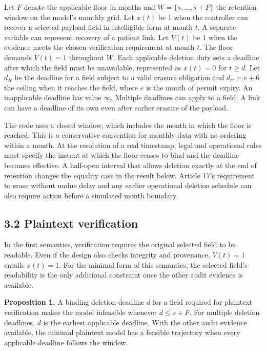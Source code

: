 \documentclass[preprint,review,12pt]{elsarticle}
\begin{document}
Let \(F\) denote the applicable floor in months and
\(W = \{ s,\ldots,s + F\}\) the retention window on the model's monthly
grid. Let \(x(t)\) be 1 when the controller can recover a selected
payload field in intelligible form at month \(t\). A separate variable
can represent recovery of a patient link. Let \(V(t)\) be 1 when the
evidence meets the chosen verification requirement at month \(t\). The
floor demands \(V(t) = 1\) throughout \(W\). Each applicable deletion
duty sets a deadline after which the field must be unavailable,
represented as \(x(t) = 0\) for \(t \geq d\). Let \(d_{R}\) be the
deadline for a field subject to a valid erasure obligation and
\(d_{C} = e + 6\) the ceiling when it reaches the field, where \(e\) is
the month of permit expiry. An inapplicable deadline has value
\(\infty\). Multiple deadlines can apply to a field. A link can have a
deadline of its own even after earlier erasure of the payload.

The code uses a closed window, which includes the month in which the
floor is reached. This is a conservative convention for monthly data
with no ordering within a month. At the resolution of a real timestamp,
legal and operational rules must specify the instant at which the floor
ceases to bind and the deadline becomes effective. A half-open interval
that allows deletion exactly at the end of retention changes the
equality case in the result below. Article 17's requirement to erase
without undue delay and any earlier operational deletion schedule can
also require action before a simulated month boundary.

\hypertarget{plaintext-verification}{%
\subsection{3.2 Plaintext verification}\label{plaintext-verification}}

In the first semantics, verification requires the original selected
field to be readable. Even if the design also checks integrity and
provenance, \(V(t) = 1\) entails \(x(t) = 1\). For the minimal form of
this semantics, the selected field's readability is the only additional
constraint once the other audit evidence is available.

\textbf{Proposition 1.} A binding deletion deadline \(d\) for a field
required for plaintext verification makes the model infeasible whenever
\(d \leq s + F\). For multiple deletion deadlines, \(d\) is the earliest
applicable deadline. With the other audit evidence available, the
minimal plaintext model has a feasible trajectory when every applicable
deadline follows the window.
\end{document}
